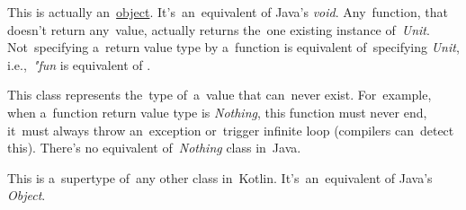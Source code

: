 
\label{kotlinunit}
This is actually an~\hyperref[kotlinobject]{object}.
It's~an~equivalent of Java's \textit{void}.
Any~function, that doesn't return any~value, actually returns the~one existing instance \mbox{of \textit{Unit}}.
Not~specifying a~return value type by a~function is equivalent of~specifying \textit{Unit}, \mbox{i.e., \textit{"fun}}  is equivalent of .

\label{kotlinnothing}
This class represents the~type of~a~value that can~never exist.
For~example, when a~function return value type is \textit{Nothing}, this function must never end, it~must always throw an~exception or~trigger infinite loop (compilers can~detect this).
There's no equivalent \mbox{of \textit{Nothing}} class in~Java.

This is a~supertype of~any other class in~Kotlin.
It's~an~equivalent of Java's \textit{Object}.
